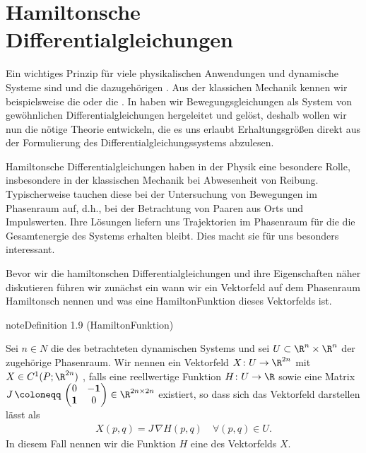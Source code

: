 \documentclass[letterpaper,10pt,english]{jupyterBook}
\begin{document}
\section{Hamiltonsche Differentialgleichungen}
\label{\detokenize{ode/hamilton:hamiltonsche-differentialgleichungen}}\label{\detokenize{ode/hamilton::doc}}
\sphinxAtStartPar
Ein wichtiges Prinzip für viele physikalischen Anwendungen und dynamische Systeme sind  und die dazugehörigen .
Aus der klassichen Mechanik kennen wir beispielsweise die  oder die .
In {\hyperref[\detokenize{ode/fluesse:s-fluesse}]{}} haben wir Bewegungsgleichungen als System von gewöhnlichen Differentialgleichungen hergeleitet und gelöst, deshalb wollen wir nun die nötige Theorie entwickeln, die es uns erlaubt Erhaltungsgrößen direkt aus der Formulierung des Differentialgleichungssystems abzulesen.

\sphinxAtStartPar
Hamiltonsche Differentialgleichungen haben in der Physik eine besondere Rolle, insbesondere in der klassischen Mechanik bei Abwesenheit von Reibung.
Typischerweise tauchen diese bei der Untersuchung von Bewegungen im Phasenraum auf, d.h., bei der Betrachtung von Paaren aus Orts\sphinxhyphen{} und Impulswerten.
Ihre Lösungen liefern uns Trajektorien im Phasenraum für die die Gesamtenergie des Systems erhalten bleibt.
Dies macht sie für uns besonders interessant.

\sphinxAtStartPar
Bevor wir die hamiltonschen Differentialgleichungen und ihre Eigenschaften näher diskutieren führen wir zunächst ein wann wir ein Vektorfeld auf dem Phasenraum Hamiltonsch nennen und was eine Hamilton\sphinxhyphen{}Funktion dieses Vektorfelds ist.
\label{ode/hamilton:def:hamiltonsch}
\begin{sphinxadmonition}{note}{Definition 1.9 (Hamilton\sphinxhyphen{}Funktion)}



\sphinxAtStartPar
Sei \(n \in N\) die  des betrachteten dynamischen Systems und sei \(U\subset \R^n \times \R^n\) der zugehörige Phasenraum.
Wir nennen ein Vektorfeld \(X \colon U \rightarrow \R^{2n}\) mit \(X \in C^1(P;\R^{2n})\) , falls eine reellwertige Funktion \(H \colon U \rightarrow \R\) sowie eine Matrix \(J \, \coloneqq \, \begin{pmatrix}0 & -\mathbf{1}\\ \mathbf{1} & 0 \end{pmatrix} \in \R^{2n \times 2n}\) existiert, so dass sich das Vektorfeld darstellen lässt als
\begin{equation}\label{equation:ode/hamilton:eq:hamilton_Gleichung}
\begin{split}X(p,q) = J \, \nabla H (p,q) \quad \forall (p,q) \in U.\end{split}
\end{equation}
\sphinxAtStartPar
In diesem Fall nennen wir die Funktion \(H\) eine  des Vektorfelds \(X\).
\end{sphinxadmonition}
\end{document}
